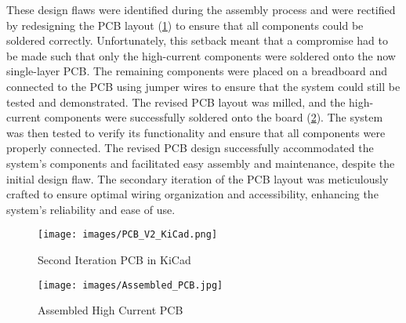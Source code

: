 \documentclass[12pt]{article} %
\begin{document}
\noindent These design flaws were identified during the assembly process and were rectified by redesigning the PCB layout (\ref{fig:PCB_DESIGN_V2}) to ensure that all components could be soldered correctly. Unfortunately, this setback meant that a compromise had to be made such that only the high-current components were soldered onto the now single-layer PCB. The remaining components were placed on a breadboard and connected to the PCB using jumper wires to ensure that the system could still be tested and demonstrated. The revised PCB layout was milled, and the high-current components were successfully soldered onto the board (\ref{fig:Assembled_PCB}). The system was then tested to verify its functionality and ensure that all components were properly connected. The revised PCB design successfully accommodated the system's components and facilitated easy assembly and maintenance, despite the initial design flaw. The secondary iteration of the PCB layout was meticulously crafted to ensure optimal wiring organization and accessibility, enhancing the system's reliability and ease of use.
\begin{figure}[H]
    \centering
    \texttt{[image: images/PCB\_V2\_KiCad.png]}
    \caption{Second Iteration PCB in KiCad}
    \label{fig:PCB_DESIGN_V2}
\end{figure}

\begin{figure}[H]
    \centering
    \texttt{[image: images/Assembled\_PCB.jpg]}
    \caption{Assembled High Current PCB}
    \label{fig:Assembled_PCB}
\end{figure}
\end{document}
